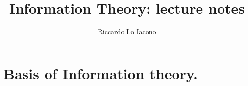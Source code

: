 \documentclass[moon, colormath]{lectures2}
\title{Information Theory: lecture notes}
\author{Riccardo Lo Iacono}
\begin{document}
    \maketitle\clearpage

    \section{Basis of Information theory.}
    
\end{document}
